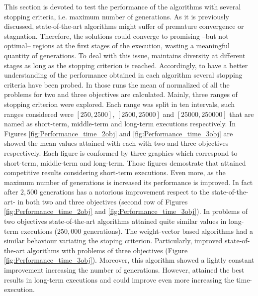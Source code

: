 This section is devoted to test the performance of the algorithms with several stopping criteria, i.e. maximum number of generations.
%
As it is previously discussed, state-of-the-art algorithms might suffer of premature convergence or stagnation.
%
Therefore, the solutions could converge to promising --but not optimal-- regions at the first stages of the execution, wasting a meaningful quantity of generations.
%
To deal with this issue, \VSDMOEA{} maintains diversity at different stages as long as the stopping criterion is reached.
%
Accordingly, to have a better understanding of the performance obtained in each algorithm several stopping criteria have been probed.
%
In those runs the mean of normalized \HV{} of all the problems for two and three objectives are calculated.
%
Mainly, three ranges of stopping criterion were explored.
%
Each range was split in ten intervals, such ranges considered were $[250, 2500]$, $[2500, 25000]$ and $[25000, 250000]$ that are named as short-term, middle-term and long-term executions respectively.
%
In Figures \ref{fig:Performance_time_2obj} and \ref{fig:Performance_time_3obj} are showed the mean \HV{} values attained with each \MOEA{} with two and three objectives respectively.
%
Each figure is conformed by three graphics which correspond to short-term, middle-term and long-term.
%
Those figures demostrate that \VSDMOEA{} attained competitive results considering short-term executions.
%
Even more, as the maximum number of generations is increased its performance is improved.
%
In fact after $2,500$ generations \VSDMOEA{} has a notorious improvement respect to the state-of-the-art-\MOEAS{} in both two and three objectives (second row of Figures \ref{fig:Performance_time_2obj} and \ref{fig:Performance_time_3obj}).
%
In problems of two objectives state-of-the-art algorithms attained quite similar \HV{} values in long-term executions ($250,000$ generations).
%
The weight-vector based algorithms had a similar behaviour variating the stoping criterion.
%
Particularly, \RMOEA{} improved state-of-the-art algorithms with problems of three objectives (Figure \ref{fig:Performance_time_3obj}).
%
Moreover, this algorithm showed a lightly constant improvement increasing the number of generations.
%
However, \VSDMOEA{} attained the best results in long-term executions and could improve even more increasing the time-execution.
%


